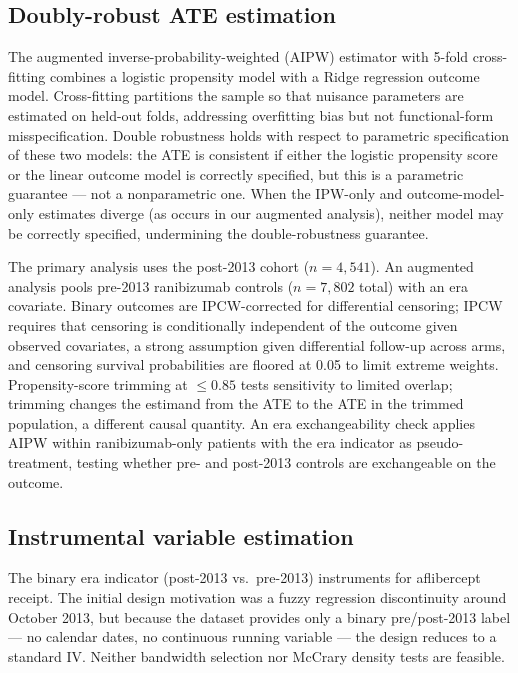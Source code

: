 \documentclass{article}
\begin{document}
\subsection{Doubly-robust ATE estimation}

The augmented inverse-probability-weighted (AIPW) estimator with 5-fold cross-fitting combines a logistic propensity model with a Ridge regression outcome model. Cross-fitting partitions the sample so that nuisance parameters are estimated on held-out folds, addressing overfitting bias but not functional-form misspecification. Double robustness holds with respect to parametric specification of these two models: the ATE is consistent if either the logistic propensity score or the linear outcome model is correctly specified, but this is a parametric guarantee --- not a nonparametric one. When the IPW-only and outcome-model-only estimates diverge (as occurs in our augmented analysis), neither model may be correctly specified, undermining the double-robustness guarantee.

The primary analysis uses the post-2013 cohort ($n = 4{,}541$). An augmented analysis pools pre-2013 ranibizumab controls ($n = 7{,}802$ total) with an era covariate. Binary outcomes are IPCW-corrected for differential censoring; IPCW requires that censoring is conditionally independent of the outcome given observed covariates, a strong assumption given differential follow-up across arms, and censoring survival probabilities are floored at 0.05 to limit extreme weights. Propensity-score trimming at $\leq 0.85$ tests sensitivity to limited overlap; trimming changes the estimand from the ATE to the ATE in the trimmed population, a different causal quantity. An era exchangeability check applies AIPW within ranibizumab-only patients with the era indicator as pseudo-treatment, testing whether pre- and post-2013 controls are exchangeable on the outcome.

\subsection{Instrumental variable estimation}

The binary era indicator (post-2013 vs.\ pre-2013) instruments for aflibercept receipt. The initial design motivation was a fuzzy regression discontinuity around October 2013, but because the dataset provides only a binary pre/post-2013 label --- no calendar dates, no continuous running variable --- the design reduces to a standard IV. Neither bandwidth selection nor McCrary density tests are feasible.
\end{document}
